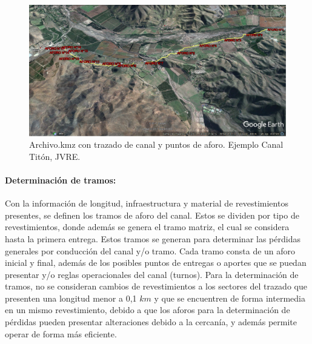 \documentclass[]{article}
\begin{document}
\begin{figure}[H]
\centering
\includegraphics[width=\textwidth]{images/puntos_de_aforo_kml2.eps}
\caption{Archivo.kmz con trazado de canal y puntos de aforo. Ejemplo Canal Titón, JVRE.}
\label{kmz}
\end{figure}

\paragraph{Determinación de tramos:} Con la información de longitud, infraestructura y material de revestimientos presentes, se definen los tramos de aforo del canal. Estos se dividen por tipo de revestimientos, donde además se genera el tramo matriz, el cual se considera hasta la primera entrega. Estos tramos se generan para determinar las pérdidas generales por conducción del canal y/o tramo. Cada tramo consta de un aforo inicial y final, además de los posibles puntos de entregas o aportes que se puedan presentar y/o reglas operacionales del canal (turnos). Para la determinación de tramos, no se consideran cambios de revestimientos a los sectores del trazado que presenten una longitud menor a 0,1 $km$ y que se encuentren de forma intermedia en un mismo revestimiento, debido a que los aforos para la determinación de pérdidas pueden presentar alteraciones debido a la cercanía, y además permite operar de forma más eficiente.
\end{document}

